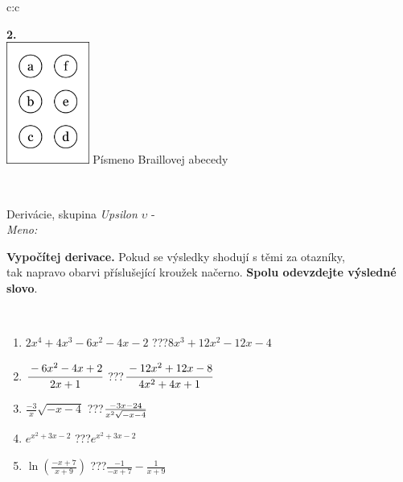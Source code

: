 \documentclass[10pt]{report}
\begin{document}
\begin{tabular}{c:c}
\begin{minipage}[c][104.5mm][t]{0.5\linewidth}
\begin{center}
\begin{minipage}{0.20\linewidth}
\begin{center}
{\Huge\bfseries 2.} \\[2mm]
\includegraphics[height=40mm]{../images/braille.png}
{\small Písmeno Braillovej abecedy}
\end{center}
\end{minipage}
\end{center}
\end{minipage}
\\ \hdashline
\begin{minipage}[c][104.5mm][t]{0.5\linewidth}
\begin{center}
\vspace{7mm}
{\huge Derivácie, skupina \textit{Upsilon $\upsilon$} -}\\[5mm]
\textit{Meno:}\phantom{xxxxxxxxxxxxxxxxxxxxxxxxxxxxxxxxxxxxxxxxxxxxxxxxxxxxxxxxxxxxxxxxx}\\[5mm]
\begin{minipage}{0.95\linewidth}
\begin{center}
\textbf{Vypočítej derivace.} Pokud se výsledky shodují s těmi za otazníky,\\tak napravo obarvi příslušející kroužek načerno. \textbf{Spolu odevzdejte výsledné slovo}.
\end{center}
\end{minipage}
\\[1mm]
\begin{minipage}{0.79\linewidth}
\begin{center}
\begin{varwidth}{\linewidth}
\begin{enumerate}
\normalsize
\item $2x^4+4x^3-6x^2-4x-2$\quad \dotfill\; ???\;\dotfill \quad $8x^3+12x^2-12x-4$
\item $\cfrac{-6x^2-4x+2}{2x+1}$\quad \dotfill\; ???\;\dotfill \quad $\cfrac{-12x^2+12x-8}{4x^2+4x+1}$
\item $\frac{-3}{x}\sqrt{-x-4}$\quad \dotfill\; ???\;\dotfill \quad $\frac{-3x-24}{x^2 \sqrt{\smash[b]{-x-4}}}$
\item $e^{x^2+3x-2}$\quad \dotfill\; ???\;\dotfill \quad $e^{x^2+3x-2}$
\item $\ln{\left(\frac{-x+7}{x+9}\right)}$\quad \dotfill\; ???\;\dotfill \quad $\frac{-1}{-x+7}-\frac{1}{x+9}$

\end{enumerate}
\end{varwidth}
\end{center}
\end{minipage}
\end{center}
\end{minipage}
\end{tabular}
\end{document}
